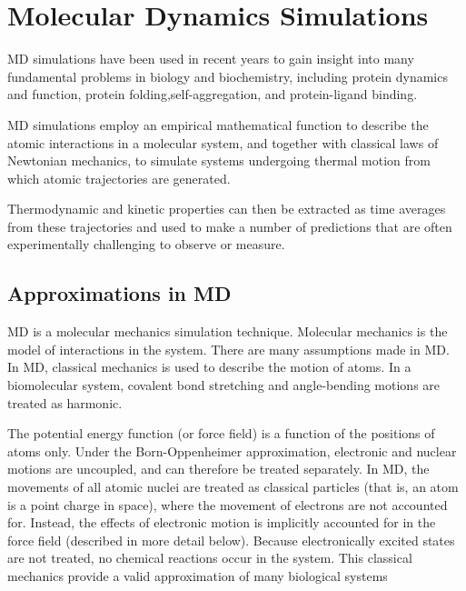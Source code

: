 \chapter{Molecular Dynamics Simulations}

MD simulations have been used in recent years to gain insight into many fundamental problems in biology and biochemistry, including protein dynamics and function, protein folding,self-aggregation, and protein-ligand binding.

MD simulations employ an empirical mathematical function to describe the atomic interactions in a molecular system, and together with classical laws of Newtonian mechanics, to simulate systems undergoing thermal motion from which atomic trajectories are generated. 

Thermodynamic and kinetic properties can then be extracted as time averages from these trajectories and used to make a number of predictions that are often experimentally challenging to observe or measure.

\section{Approximations in MD}

MD is a molecular mechanics simulation technique.  Molecular mechanics is the model of interactions in the system. There are many assumptions made in MD.  In MD, classical mechanics is used to describe the motion of atoms.  In a biomolecular system, covalent bond stretching and angle-bending motions are treated as harmonic.

The potential energy function (or force field) is a function of the positions of atoms only.  Under the Born-Oppenheimer approximation, electronic and nuclear motions are uncoupled, and can therefore be treated separately.  
In MD, the movements of all atomic nuclei are treated as classical particles (that is, an atom is a point charge in space), where the movement of electrons are not accounted for. Instead, the effects of electronic motion is implicitly accounted for in the force field (described in more detail below). Because electronically excited states are not treated, no chemical reactions occur in the system. 
This classical mechanics provide a valid approximation of many biological systems %

